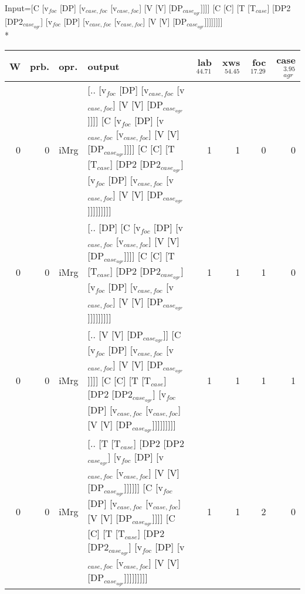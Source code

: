 \begingroup\scriptsize Input=[C [v$_{foc}$ [DP] [v$_{case,foc}$ [v$_{case,foc}$] [V [V] [DP$_{case_{agr}}$]]]] [C [C] [T [T$_{case}$] [DP2 [DP2$_{case_{agr}}$] [v$_{foc}$ [DP] [v$_{case,foc}$ [v$_{case,foc}$] [V [V] [DP$_{case_{agr}}$]]]]]]]]\\*
\begin{tabularx}{\linewidth}{rrlXrrrr}
\hline
   W &   prb. & opr.   & output                                                                                                                                                                                                                                                                      &   lab$^{44.71}$ &   xws$^{54.45}$ &   foc$^{17.29}$ &   case$_{agr}^{3.95}$ \\
\hline
   0 &   0 & iMrg & [.. [v$_{foc}$ [DP] [v$_{case,foc}$ [v$_{case,foc}$] [V [V] [DP$_{case_{agr}}$]]]] [C [v$_{foc}$ [DP] [v$_{case,foc}$ [v$_{case,foc}$] [V [V] [DP$_{case_{agr}}$]]]] [C [C] [T [T$_{case}$] [DP2 [DP2$_{case_{agr}}$] [v$_{foc}$ [DP] [v$_{case,foc}$ [v$_{case,foc}$] [V [V] [DP$_{case_{agr}}$]]]]]]]]]                                   &             1 &             1 &             0 &                  0 \\
   0 &   0 & iMrg & [.. [DP] [C [v$_{foc}$ [DP] [v$_{case,foc}$ [v$_{case,foc}$] [V [V] [DP$_{case_{agr}}$]]]] [C [C] [T [T$_{case}$] [DP2 [DP2$_{case_{agr}}$] [v$_{foc}$ [DP] [v$_{case,foc}$ [v$_{case,foc}$] [V [V] [DP$_{case_{agr}}$]]]]]]]]]                                                                                           &             1 &             1 &             1 &                  0 \\
   0 &   0 & iMrg & [.. [V [V] [DP$_{case_{agr}}$]] [C [v$_{foc}$ [DP] [v$_{case,foc}$ [v$_{case,foc}$] [V [V] [DP$_{case_{agr}}$]]]] [C [C] [T [T$_{case}$] [DP2 [DP2$_{case_{agr}}$] [v$_{foc}$ [DP] [v$_{case,foc}$ [v$_{case,foc}$] [V [V] [DP$_{case_{agr}}$]]]]]]]]]                                                                          &             1 &             1 &             1 &                  1 \\
   0 &   0 & iMrg & [.. [T [T$_{case}$] [DP2 [DP2$_{case_{agr}}$] [v$_{foc}$ [DP] [v$_{case,foc}$ [v$_{case,foc}$] [V [V] [DP$_{case_{agr}}$]]]]]] [C [v$_{foc}$ [DP] [v$_{case,foc}$ [v$_{case,foc}$] [V [V] [DP$_{case_{agr}}$]]]] [C [C] [T [T$_{case}$] [DP2 [DP2$_{case_{agr}}$] [v$_{foc}$ [DP] [v$_{case,foc}$ [v$_{case,foc}$] [V [V] [DP$_{case_{agr}}$]]]]]]]]] &             1 &             1 &             2 &                  0 \\

\end{tabularx}
